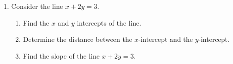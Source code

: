 \begin{enumerate}
\newpage

\item Consider the line $x+2y=3$.
\begin{enumerate}
\item Find the $x$ and $y$ intercepts of the line.
\vfill
\item Determine the distance between the $x$-intercept and the $y$-intercept.
\vfill 
\item Find the slope of the line $x+2y=3$.
\vfill
\end{enumerate}

\end{enumerate}

















